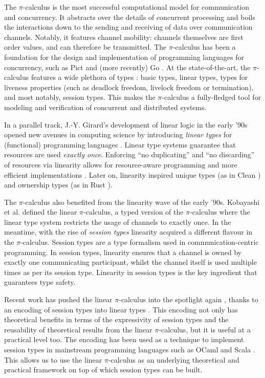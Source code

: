\documentclass[a4paper,UKenglish,cleveref,autoref,thm-restate,authorcolumns]{lipics-v2019}
\theoremstyle{definition}
\newcommand{\picalc}{$\pi$-calculus}
\begin{document}
The \picalc{} \cite{MilnerPW92,Milner99} is the most successful computational model for communication and concurrency.
It abstracts over the details of concurrent processing and boils the interactions down to the sending and receiving of data over communication channels.
Notably, it features channel mobility: channels themselves are first order values, and can therefore be transmitted.
The \picalc{} has been a foundation for the design and implementation of programming languages for concurrency, such as Pict \cite{Pierce} and (more recently) Go \cite{Golang}.
At the state-of-the-art, the \picalc{} features a wide plethora of types \cite{K07}: basic types, linear types, types for liveness properties (such as deadlock freedom, livelock freedom or termination), and most notably, session types. This makes the \picalc{} a fully-fledged tool for modeling and verification of concurrent and distributed systems.

In a parallel track, J.-Y. Girard's development of linear logic \cite{Girard87} in the early '90s opened new avenues in computing science by introducing \emph{linear types} for (functional) programming languages \cite{Curry-Howard,Wadler90,Bernardy2018}.
Linear type systems guarantee that resources are used \emph{exactly once}.
Enforcing ``no duplicating'' and ``no discarding'' of resources via linearity allows for resource-aware programming and more efficient implementations \cite{Wadler90}.
Later on, linearity inspired unique types (as in Clean \cite{BarendsenS96}) and ownership types (as in Rust \cite{MatsakisK14}).

The \picalc{} also benefited from the linearity wave of the early '90s.
Kobayashi et al. \cite{KPT96} defined the {linear} \picalc{}, a typed version of the \picalc{} where the linear type system restricts the usage of channels to exactly once.
%
In the meantime, with the rise of \emph{session types} \cite{H93,THK94,HVK98} linearity acquired a different flavour in the \picalc{}.
Session types are a type formalism used in communication-centric programming.
In session types, linearity ensures that a channel is owned by exactly one communicating participant, whilst the channel itself is used multiple times as per its session type.
Linearity in session types is the key ingredient that guarantees type safety.

Recent work has pushed the linear \picalc{} into the spotlight again \cite{KPT96}, thanks to an encoding of session types into linear types \cite{DardhaGS12,Dardha14,DardhaGS17}.
This encoding not only has theoretical benefits in terms of the expressivity of session types and the reusability of theoretical results from the linear \picalc{}, but it is useful at a practical level too.
The encoding has been used as a technique to implement session types in mainstream programming languages such as OCaml \cite{Padovani17} and Scala \cite{ScalasY16,ScalasDHY17}.
This allows us to use the linear \picalc{} as an underlying theoretical and practical framework on top of which session types can be built.
\end{document}
